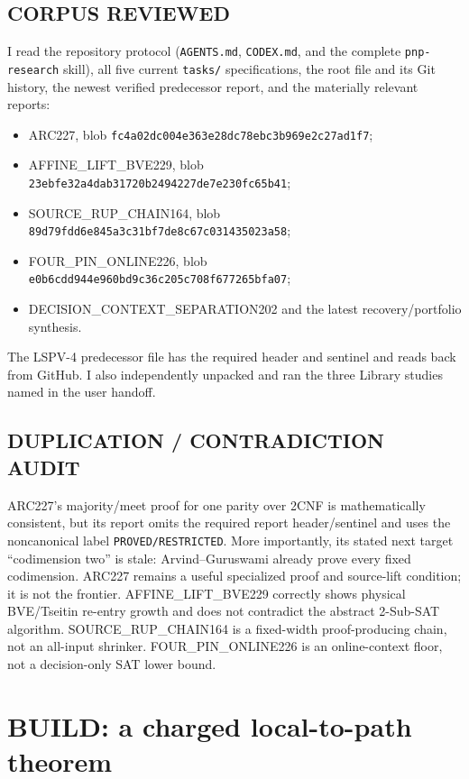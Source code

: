 \documentclass[10pt]{article}
\begin{document}
\subsection*{CORPUS REVIEWED}
I read the repository protocol (\texttt{AGENTS.md}, \texttt{CODEX.md}, and the complete
\texttt{pnp-research} skill), all five current \texttt{tasks/} specifications, the root file and
its Git history, the newest verified predecessor report, and the materially relevant reports:
\begin{itemize}
\item ARC227, blob \texttt{fc4a02dc004e363e28dc78ebc3b969e2c27ad1f7};
\item AFFINE\_LIFT\_BVE229, blob \texttt{23ebfe32a4dab31720b2494227de7e230fc65b41};
\item SOURCE\_RUP\_CHAIN164, blob \texttt{89d79fdd6e845a3c31bf7de8c67c031435023a58};
\item FOUR\_PIN\_ONLINE226, blob \texttt{e0b6cdd944e960bd9c36c205c708f677265bfa07};
\item DECISION\_CONTEXT\_SEPARATION202 and the latest recovery/portfolio synthesis.
\end{itemize}
The LSPV-4 predecessor file has the required header and sentinel and reads back from GitHub.
I also independently unpacked and ran the three Library studies named in the user handoff.

\subsection*{DUPLICATION / CONTRADICTION AUDIT}
ARC227's majority/meet proof for one parity over 2CNF is mathematically consistent, but its
report omits the required report header/sentinel and uses the noncanonical label
\texttt{PROVED/RESTRICTED}.  More importantly, its stated next target ``codimension two'' is
stale: Arvind--Guruswami already prove every fixed codimension.  ARC227 remains a useful
specialized proof and source-lift condition; it is not the frontier.  AFFINE\_LIFT\_BVE229
correctly shows physical BVE/Tseitin re-entry growth and does not contradict the abstract
2-Sub-SAT algorithm.  SOURCE\_RUP\_CHAIN164 is a fixed-width proof-producing chain, not an
all-input shrinker.  FOUR\_PIN\_ONLINE226 is an online-context floor, not a decision-only SAT
lower bound.

\section{BUILD: a charged local-to-path theorem}
\end{document}
